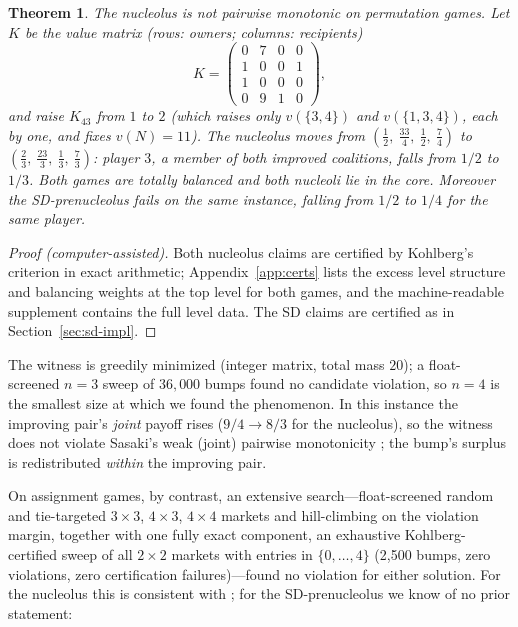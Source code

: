 \documentclass[11pt]{article}
\newtheorem{theorem}{Theorem}[section]
\begin{document}
\begin{theorem}\label{thm:permutation}
The nucleolus is not pairwise monotonic on permutation games. Let $K$ be the
value matrix (rows: owners; columns: recipients)
\[
K=\begin{pmatrix}0&7&0&0\\ 1&0&0&1\\ 1&0&0&0\\ 0&9&1&0\end{pmatrix},
\]
and raise $K_{43}$ from $1$ to $2$ (which raises only
$v(\{3,4\})$ and $v(\{1,3,4\})$, each by one, and fixes $v(N)=11$). The
nucleolus moves from
$(\tfrac12,\ \tfrac{33}{4},\ \tfrac12,\ \tfrac74)$ to
$(\tfrac23,\ \tfrac{23}{3},\ \tfrac13,\ \tfrac73)$: player $3$, a member of
both improved coalitions, falls from $1/2$ to $1/3$. Both games are totally
balanced and both nucleoli lie in the core. Moreover the SD-prenucleolus
fails on the same instance, falling from $1/2$ to $1/4$ for the same player.
\end{theorem}

\begin{proof}[Proof (computer-assisted)]
Both nucleolus claims are certified by Kohlberg's criterion in exact
arithmetic; Appendix~\ref{app:certs} lists the excess level structure and
balancing weights at the top level for both games, and the machine-readable
supplement contains the full level data. The SD claims are certified as in
Section~\ref{sec:sd-impl}.
\end{proof}

The witness is greedily minimized (integer matrix, total mass $20$); a
float-screened $n=3$ sweep of $36{,}000$ bumps found no candidate
violation, so $n=4$ is the smallest size at which we found the phenomenon. In this instance the improving pair's
\emph{joint} payoff rises ($9/4\to 8/3$ for the nucleolus), so the witness
does not violate Sasaki's weak (joint) pairwise monotonicity \citep{Sasaki95};
the bump's surplus is redistributed \emph{within} the improving pair.

On assignment games, by contrast, an extensive search---float-screened
random and tie-targeted $3\times3$, $4\times3$, $4\times4$ markets and
hill-climbing on the violation margin, together with one fully exact
component, an exhaustive Kohlberg-certified sweep of all $2\times2$ markets
with entries in $\{0,\dots,4\}$ (2{,}500 bumps, zero violations, zero
certification failures)---found no violation for either solution. For the nucleolus this is consistent with \citep{SFP2008}; for the
SD-prenucleolus we know of no prior statement:
\end{document}
